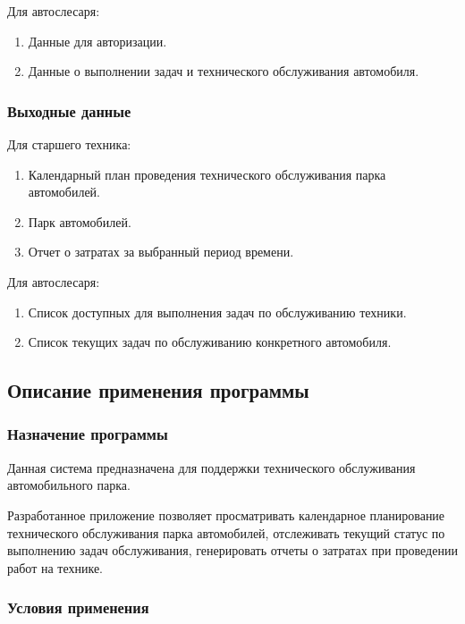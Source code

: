 \documentclass[../nirs.tex]{subfiles}
\begin{document}
    Для автослесаря:
    \begin{enumerate}
        \item Данные для авторизации.
        \item Данные о выполнении задач и технического обслуживания автомобиля.
    \end{enumerate}

    \subsubsection*{Выходные данные}
    Для старшего техника:
    \begin{enumerate}
        \item Календарный план проведения технического обслуживания парка
            автомобилей.
        \item Парк автомобилей.
        \item Отчет о затратах за выбранный период времени.
    \end{enumerate}

    Для автослесаря:
    \begin{enumerate}
        \item Список доступных для выполнения задач по обслуживанию техники.
        \item Список текущих задач по обслуживанию конкретного автомобиля.
    \end{enumerate}

    \subsection{Описание применения программы}
    \subsubsection*{Назначение программы}

    Данная система предназначена для поддержки технического обслуживания
    автомобильного парка.

    Разработанное приложение позволяет просматривать календарное планирование
    технического обслуживания парка автомобилей, отслеживать текущий статус по
    выполнению задач обслуживания, генерировать отчеты о затратах при проведении
    работ на технике.

    \subsubsection*{Условия применения}
\end{document}
